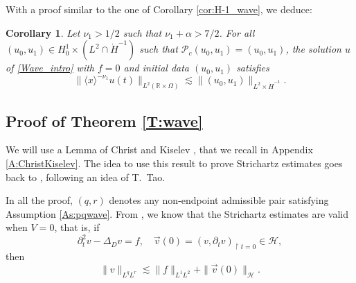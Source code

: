 \documentclass[10pt,leqno]{amsart}
\newtheorem{corollary}[theorem]{Corollary}
\theoremstyle{definition}%
\theoremstyle{remark}
\numberwithin{equation}{section}
\newcommand{\R}{\mathbb{R}}
\renewcommand{\^}{\widehat}%
\newcommand{\HHH}{\mathcal{H}}
\newcommand{\PPP}{\mathcal{P}}
\begin{document}
With a proof similar to the one of Corollary \ref{cor:H-1_wave}, we deduce:
\begin{corollary}
\label{cor:integrability_H-1}
Let $\nu_1>1/2$ such that $\nu_1+\alpha>7/2$.
For all $(u_0,u_1)\in H^1_0\times (L^2\cap \dot{H}^{-1})$ such that $\PPP_c(u_0,u_1)=(u_0,u_1)$, the solution $u$ of \eqref{Wave_intro} with $f=0$ and initial data $(u_0,u_1)$ satisfies
$$ \|\langle x \rangle^{-\nu_1}u(t)\|_{L^2(\R\times \Omega)}\lesssim \|(u_0,u_1)\|_{L^2\times\dot{H}^{-1}}.$$
\end{corollary}


\subsection{Proof of Theorem \ref{T:wave}}
\label{sub:mainproof}
We will use a Lemma of Christ and Kiselev \cite{ChKi01}, that we recall in Appendix \ref{A:ChristKiselev}. The idea to use this result to prove Strichartz estimates goes back to \cite{SmithSogge00}, following an idea of T.~Tao. %

In all the proof, $(q,r)$ denotes any non-endpoint admissible pair satisfying Assumption \ref{As:pqwave}.
From \cite{SmithSogge00,Burq03}, we know that the Strichartz estimates are valid when $V=0$, that is, if
\begin{equation}
\label{eqv_free}
\partial_{t}^2 v-\Delta_D v=f,\quad \vec{v}(0)=(v,\partial_tv)_{\restriction t=0}\in \HHH,\end{equation} 
then 
$$\|v\|_{L^qL^r}\lesssim \|f\|_{L^1L^2}+\|\vec{v}(0)\|_{\HHH}.$$

\smallskip
\end{document}
